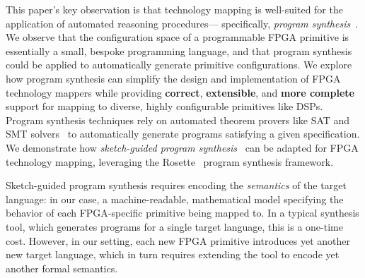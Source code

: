 This paper's
  key observation is that 
  technology mapping
  is well-suited for the application
  of automated reasoning procedures---%
  specifically,
  \textit{program synthesis}~\cite{gulwani2017program}.
We observe that 
  the configuration space of
  a programmable FPGA primitive
  is essentially a small, bespoke
  programming language,
  and that
  program synthesis
  could be applied
  to automatically generate
  primitive configurations.
We explore how
  program synthesis
  can simplify the design and implementation of
  FPGA technology mappers while providing
  \textbf{correct},
  \textbf{extensible}, and
  \textbf{more complete}
  support for mapping to 
  diverse, highly configurable primitives
  like DSPs.
Program synthesis techniques rely on
  automated theorem provers like
  SAT and SMT solvers~\cite{de2008z3, barbosa22cvc5}
  to automatically generate programs
  satisfying a given specification.
We demonstrate how
 \textit{sketch-guided program synthesis}~\cite{solar2008program}
  can be adapted
  for FPGA technology mapping,
  leveraging the
  Rosette~\cite{torlak2014lightweight} 
  program synthesis framework.


Sketch-guided program synthesis requires
  encoding the \textit{semantics}
  of the target language:
  in our case,
  a machine-readable,
  mathematical model specifying
  the behavior of each
  FPGA-specific primitive
  being mapped to.
In a typical synthesis tool,
  which generates programs
  for a single target language,
  this is a one-time cost.
However,
  in our setting,
  each new FPGA primitive
  introduces yet another new target language,
  which in turn requires
  extending the tool to encode
  yet another formal semantics.

